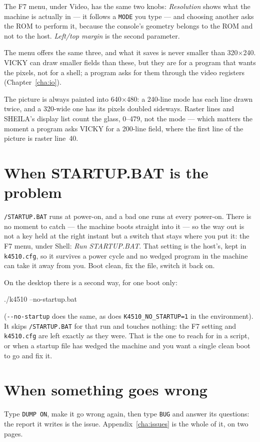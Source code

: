 The F7 menu, under Video, has the same two knobs: \emph{Resolution} shows
what the machine is actually in --- it follows a \verb|MODE| you type ---
and choosing another asks the ROM to perform it, because the console's
geometry belongs to the ROM and not to the host. \emph{Left/top margin}
is the second parameter.

The menu offers the same three, and what it saves is never smaller than
320$\times$240. VICKY can draw smaller fields than these, but they are for
a program that wants the pixels, not for a shell; a program asks for them
through the video registers (Chapter~\ref{cha:io}).

The picture is always painted into 640$\times$480: a 240-line mode has
each line drawn twice, and a 320-wide one has its pixels doubled
sideways. Raster lines and SHEILA's display list count the glass,
0--479, not the mode --- which matters the moment a program asks VICKY
for a 200-line field, where the first line of the picture is raster
line~40.

\section{When STARTUP.BAT is the problem}\label{sec:badstartup}
\texttt{/STARTUP.BAT} runs at power-on, and a bad one runs at every
power-on. There is no moment to catch --- the machine boots straight into
it --- so the way out is not a key held at the right instant but a switch
that stays where you put it: the F7 menu, under Shell:
\emph{Run STARTUP.BAT}. That setting is the host's, kept in
\texttt{k4510.cfg}, so it survives a power cycle and no wedged program in
the machine can take it away from you. Boot clean, fix the file, switch it
back on.

On the desktop there is a second way, for one boot only:

\begin{type}
./k4510 --no-startup.bat
\end{type}

\noindent (\verb|--no-startup| does the same, as does
\verb|K4510_NO_STARTUP=1| in the environment). It skips
\texttt{/STARTUP.BAT} for that run and touches nothing: the F7 setting
and \texttt{k4510.cfg} are left exactly as they were. That is the one to
reach for in a script, or when a startup file has wedged the machine and
you want a single clean boot to go and fix it.

\section{When something goes wrong}
Type \verb|DUMP ON|, make it go wrong again, then type \verb|BUG| and
answer its questions: the report it writes is the issue.
Appendix~\ref{cha:issues} is the whole of it, on two pages.
